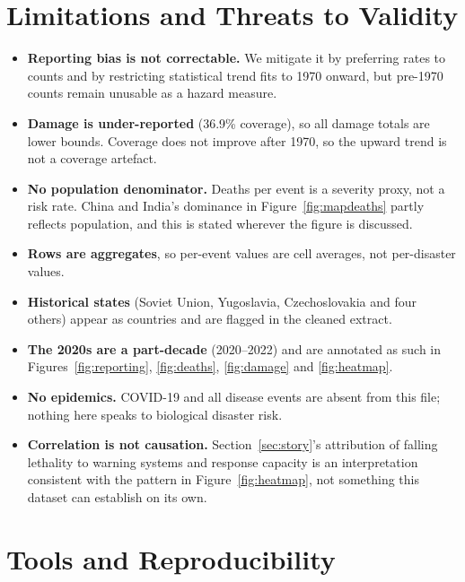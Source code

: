 \documentclass[11pt,a4paper]{article}
\begin{document}
\section{Limitations and Threats to Validity}
\label{sec:limits}

\begin{itemize}
\item \textbf{Reporting bias is not correctable.} We mitigate it by preferring
  rates to counts and by restricting statistical trend fits to 1970 onward, but
  pre-1970 counts remain unusable as a hazard measure.
\item \textbf{Damage is under-reported} (36.9\% coverage), so all damage totals
  are lower bounds. Coverage does not improve after 1970, so the upward trend is
  not a coverage artefact.
\item \textbf{No population denominator.} Deaths per event is a severity proxy,
  not a risk rate. China and India's dominance in Figure~\ref{fig:mapdeaths}
  partly reflects population, and this is stated wherever the figure is
  discussed.
\item \textbf{Rows are aggregates}, so per-event values are cell averages, not
  per-disaster values.
\item \textbf{Historical states} (Soviet Union, Yugoslavia, Czechoslovakia and
  four others) appear as countries and are flagged in the cleaned extract.
\item \textbf{The 2020s are a part-decade} (2020--2022) and are annotated as such
  in Figures~\ref{fig:reporting}, \ref{fig:deaths}, \ref{fig:damage} and
  \ref{fig:heatmap}.
\item \textbf{No epidemics.} COVID-19 and all disease events are absent from this
  file; nothing here speaks to biological disaster risk.
\item \textbf{Correlation is not causation.} Section~\ref{sec:story}'s
  attribution of falling lethality to warning systems and response capacity is an
  interpretation consistent with the pattern in Figure~\ref{fig:heatmap}, not
  something this dataset can establish on its own.
\end{itemize}

\section{Tools and Reproducibility}
\label{sec:repro}
\end{document}
